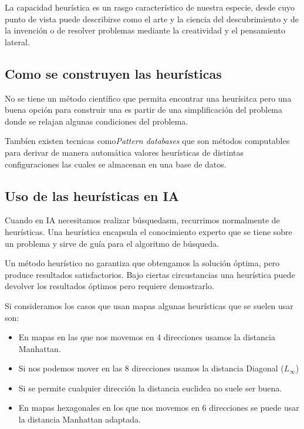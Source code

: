 \documentclass[12pt]{article}
\begin{document}
La capacidad heurística es un rasgo característico de nuestra especie,
desde cuyo punto de vista puede describirse como el arte y la ciencia
del descubrimiento y de la invención o de resolver problemas mediante
la creatividad y el pensamiento lateral.

\subsection{Como se construyen las heurísticas}

No se tiene un método científico que permita encontrar
una heurísitca pero una buena opción para construir una es partir de
una simplificación del problema donde se relajan algunas condiciones
del problema.

Tambíen existen tecnicas como\textit{Pattern databases} que son
métodos computables para derivar de manera automática valores
heurísticas de distintas configuraciones las cuales se almacenan en
una base de datos.

\subsection{Uso de las heurísticas en IA}

Cuando en IA necesitamos realizar búsquedasm, recurrimos normalmente
de heurísticas. Una heurística encapsula el conocimiento experto que
se tiene sobre un problema y sirve de guía para el algoritmo de
búsqueda.

Un método heurístico no garantiza que obtengamos la solución óptima,
pero produce resultados satisfactorios. Bajo ciertas circustancias una
heurística puede devolver los resultados óptimos pero requiere
demostrarlo.

Si consideramos los casos que usan mapas algunas heurísticas que se
suelen usar son:

\begin{itemize}
\item En mapas en las que nos movemos en 4 direcciones usamos la
  distancia Manhattan.
\item Si nos podemos mover en las 8 direcciones usamos la distancia Diagonal ($L_\infty$)
\item Si se permite cualquier dirección la distancia euclidea no suele ser buena.
\item En mapas hexagonales en los que nos movemos en 6 direcciones se
  puede usar la distancia Manhattan adaptada.
\end{itemize}
\end{document}
